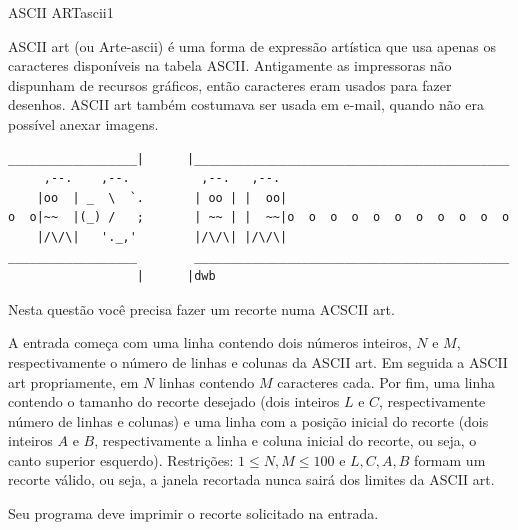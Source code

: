 \documentclass[12pt,a4paper,oneside]{article}
\begin{document}
\begin{problem}{ASCII ART}{ascii}{1}

ASCII art (ou Arte-ascii) é uma forma de expressão artística que usa apenas os caracteres disponíveis na tabela ASCII. Antigamente as impressoras não dispunham de recursos gráficos, então caracteres eram usados para fazer desenhos. ASCII art também costumava ser usada em e-mail, quando não era possível anexar imagens.

\begin{verbatim}
__________________|      |____________________________________________
     ,--.    ,--.          ,--.   ,--.
    |oo  | _  \  `.       | oo | |  oo|
o  o|~~  |(_) /   ;       | ~~ | |  ~~|o  o  o  o  o  o  o  o  o  o  o
    |/\/\|   '._,'        |/\/\| |/\/\|
__________________        ____________________________________________
                  |      |dwb
\end{verbatim}

Nesta questão você precisa fazer um recorte numa ACSCII art. 



\InputFile

A entrada começa com uma linha contendo dois números inteiros, $N$ e $M$, respectivamente o número de linhas e colunas da ASCII art. Em seguida a ASCII art propriamente, em $N$ linhas contendo $M$ caracteres cada. Por fim, uma linha contendo o tamanho do recorte desejado (dois inteiros $L$ e $C$, respectivamente número de linhas e colunas) e uma linha com a posição inicial do recorte (dois inteiros $A$ e $B$, respectivamente a linha e coluna inicial do recorte, ou seja, o canto superior esquerdo). Restrições: $1\leq N,M \leq 100$ e $L,C,A,B$ formam um recorte válido, ou seja, a janela recortada nunca sairá dos limites da ASCII art.

\OutputFile

Seu programa deve imprimir o recorte solicitado na entrada.


\Example

\begin{example}
%
\end{example}

\begin{example}
%
\end{example}



\end{problem}
\end{document}
